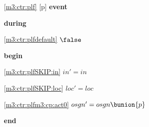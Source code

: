 \noindent \ref{m3:ctr:plf} [p] \textbf{event}
\begin{block}
\item \textbf{during}
\begin{block}
\item[ \eqref{m3:ctr:plfdefault} ]$\false$ %
\end{block}
\item \textbf{begin}
\begin{block}
\item[ \eqref{m3:ctr:plfSKIP:in} ]$in' = in$ %
\item[ \eqref{m3:ctr:plfSKIP:loc} ]$loc' = loc$ %
\item[ \eqref{m3:ctr:plfm3:cp:act0} ]$osgn' = osgn \bunion \{ p \} $ %
\end{block}
\item \textbf{end} \\
\end{block}
